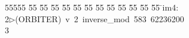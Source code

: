 %
%
\begin{tabbing}
55555 \= 55 \= 55 \= 55 \= 55 \= 55 \= 55 \= 55 \= 55 \= 55 \= 55 \= 55 \= 55 \= \>im4:\\[0pt]
2\>$\triangleright$\>(ORBITER)\ v\ 2\ inverse\_mod\ 583\ 62236200\\[0pt]
3\>\end{tabbing}
